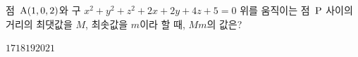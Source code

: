 점~$\mathrm{A}(1{,}\mkern3mu\mathopen{}0{,}\mkern3mu\mathopen{}2)$와 구 $x^2+y^2+z^2+2x+2y+4z+5=0$ 위를 움직이는 점~$\mathrm{P}$ 사이의 거리의 최댓값을 $M$, 최솟값을 $m$이라 할 때, $Mm$의 값은?
\begin{choices32}{$17$}{$18$}{$19$}{$20$}{$21$}\end{choices32}
